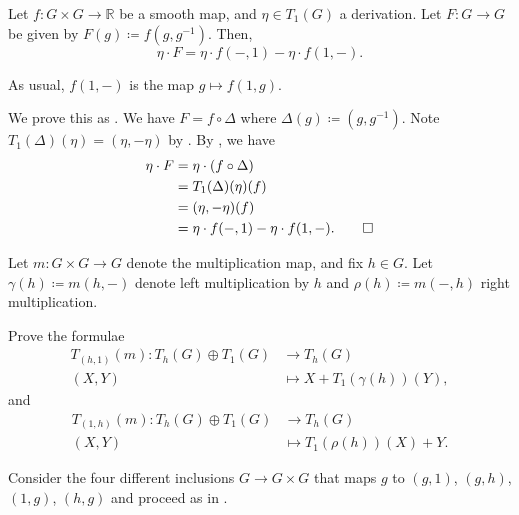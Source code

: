 \documentclass[12pt]{article}
\begin{document}
\begin{cor}
	Let $f \colon G \times G \to \mathbb{R}$ be a smooth map, and $\eta \in T_{1}(G)$ a derivation. 
	Let $F \colon G \to G$ be given by $F(g) \coloneqq f(g, g^{-1})$. 
	Then,
	\begin{equation*} 
		\eta \cdot F = \eta \cdot f(-, 1) - \eta \cdot f(1, -).
	\end{equation*}
\end{cor}
As usual, $f(1, -)$ is the map $g \mapsto f(1, g)$.
\begin{sketch}
	We prove this as . 
	We have $F = f \circ \Delta$ where $\Delta(g) \coloneqq (g, g^{-1})$. 
	Note $T_{1}(\Delta)(\eta) = (\eta, -\eta)$ by . 
	By , we have
	\begin{align*} 
		\eta \cdot F &= \eta \cdot (f \circ \Delta) \\
		&= T_{1}(\Delta)(\eta)(f) \\
		&= (\eta, -\eta)(f) \\
		&= \eta \cdot f(-, 1) - \eta \cdot f(1, -). \qedhere
	\end{align*}
\end{sketch}

\begin{exe} \label{exe:differential-multiplication-at-different-points}
	Let $m \colon G \times G \to G$ denote the multiplication map, and fix $h \in G$. 
	Let $\gamma(h) \coloneqq m(h, -)$ denote left multiplication by $h$ and $\rho(h) \coloneqq m(-, h)$ right multiplication. 

	Prove the formulae
	\begin{align*} 
		T_{(h, 1)}(m) \colon T_{h}(G) \oplus T_{1}(G) & \to T_{h}(G) \\
		(X, Y) &\mapsto X + T_{1}(\gamma(h))(Y),
	\end{align*}
	and
	\begin{align*} 
		T_{(1, h)}(m) \colon T_{h}(G) \oplus T_{1}(G) & \to T_{h}(G) \\
		(X, Y) &\mapsto T_{1}(\rho(h))(X) + Y.
	\end{align*}
\end{exe}
\begin{sketch}
	Consider the four different inclusions $G \to G \times G$ that maps $g$ to $(g, 1)$, $(g, h)$, $(1, g)$, $(h, g)$ and proceed as in .
\end{sketch}
\end{document}
